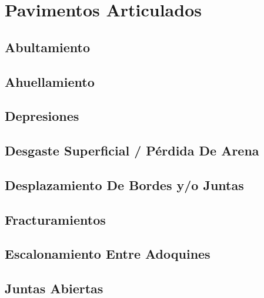 \documentclass[letterpaper,10pt,spanish]{sphinxmanual}
\begin{document}
\section{Pavimentos Articulados}
\label{patologia/articulados::doc}\label{patologia/articulados:pavimentos-articulados}\label{patologia/articulados:patologia-articulados}

\subsection{Abultamiento}
\label{patologia/articulados:abultamiento}

\subsection{Ahuellamiento}
\label{patologia/articulados:ahuellamiento}

\subsection{Depresiones}
\label{patologia/articulados:depresiones}

\subsection{Desgaste Superficial / Pérdida De Arena}
\label{patologia/articulados:desgaste-superficial-perdida-de-arena}

\subsection{Desplazamiento De Bordes y/o Juntas}
\label{patologia/articulados:desplazamiento-de-bordes-y-o-juntas}

\subsection{Fracturamientos}
\label{patologia/articulados:fracturamientos}

\subsection{Escalonamiento Entre Adoquines}
\label{patologia/articulados:escalonamiento-entre-adoquines}

\subsection{Juntas Abiertas}
\label{patologia/articulados:juntas-abiertas}
\end{document}
